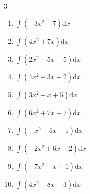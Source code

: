 \begin{multicols}{3}
\begin{enumerate}

\columnbreak %

  \item $\displaystyle \int \left( -3x^{2}-7 \right) \mathrm{d}x$


  \item $\displaystyle \int \left( 4x^{2}+7x \right) \mathrm{d}x$


  \item $\displaystyle \int \left( 2x^{2}-5x+5 \right) \mathrm{d}x$


  \item $\displaystyle \int \left( 4x^{2}-3x-2 \right) \mathrm{d}x$


  \item $\displaystyle \int \left( 3x^{2}-x+5 \right) \mathrm{d}x$


  \item $\displaystyle \int \left( 6x^{2}+7x-7 \right) \mathrm{d}x$


  \item $\displaystyle \int \left( -x^{2}+5x-1 \right) \mathrm{d}x$


  \item $\displaystyle \int \left( -2x^{2}+6x-2 \right) \mathrm{d}x$


  \item $\displaystyle \int \left( -7x^{2}-x+1 \right) \mathrm{d}x$


  \item $\displaystyle \int \left( 4x^{2}-8x+3 \right) \mathrm{d}x$


\end{enumerate}
\end{multicols}
